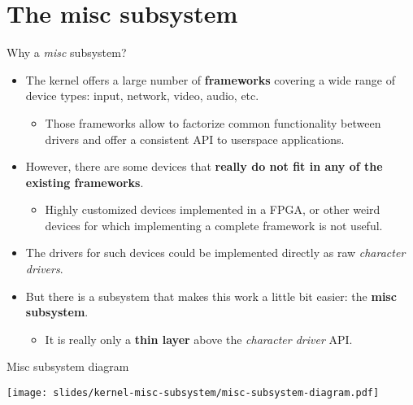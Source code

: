 \section{The misc subsystem}

\begin{frame}{Why a {\em misc} subsystem?}
  \begin{itemize}
  \item The kernel offers a large number of {\bf frameworks} covering
    a wide range of device types: input, network, video, audio,
    etc.
    \begin{itemize}
    \item Those frameworks allow to factorize common functionality
      between drivers and offer a consistent API to userspace
      applications.
    \end{itemize}
  \item However, there are some devices that {\bf really do not fit in any
    of the existing frameworks}.
    \begin{itemize}
    \item Highly customized devices implemented in a FPGA, or other
      weird devices for which implementing a complete framework is not
      useful.
    \end{itemize}
  \item The drivers for such devices could be implemented directly as
    raw {\em character drivers}.
  \item But there is a subsystem that makes this work a little bit
    easier: the {\bf misc subsystem}.
    \begin{itemize}
    \item It is really only a {\bf thin layer} above the {\em character
        driver} API.
    \end{itemize}
  \end{itemize}
\end{frame}

\begin{frame}{Misc subsystem diagram}
  \begin{center}
    \texttt{[image: slides/kernel-misc-subsystem/misc-subsystem-diagram.pdf]}
  \end{center}
\end{frame}

